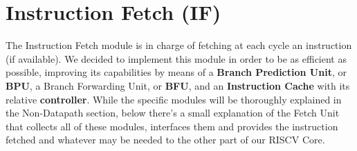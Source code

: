 \documentclass[10pt,  english, makeidx, a4paper, titlepage, oneside]{book}
\begin{document}
\section{Instruction Fetch (IF)}
The Instruction Fetch module is in charge of fetching at each cycle an instruction (if available).\newline
We decided to implement this module in order to be as efficient as possible, improving its capabilities by means of a \textbf{Branch Prediction Unit}, or \textbf{BPU}, a Branch Forwarding Unit, or \textbf{BFU}, and an \textbf{Instruction Cache} with its relative \textbf{controller}. \newline
While the specific modules will be thoroughly explained in the Non-Datapath section, below there's a small explanation of the Fetch Unit that collects all of these modules, interfaces them and provides the instruction fetched and whatever may be needed to the other part of our RISCV Core.
\end{document}
